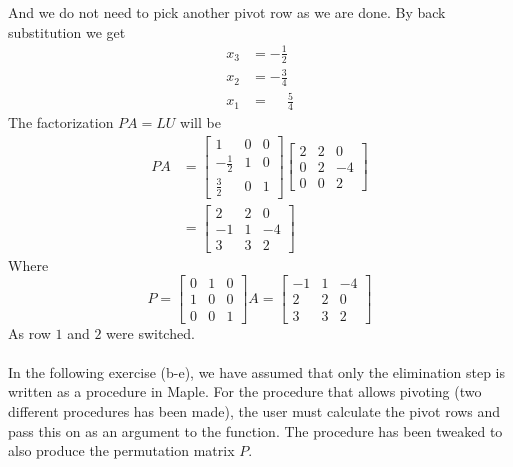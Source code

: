 \documentclass[12pt]{article}
\begin{document}
And we do not need to pick another pivot row as we are done. By back substitution we get
\begin{align*}
x_3&=-\frac{1}{2}\\
x_2&=-\frac{3}{4}\\
x_1&=\phantom{-}\frac{5}{4}
\end{align*}
The factorization $PA=LU$ will be
\begin{align*}
PA
&=
\begin{bmatrix}
1 & 0 & 0\\
-\frac{1}{2} & 1 & 0\\
\frac{3}{2} & 0 & 1
\end{bmatrix}
\begin{bmatrix}
2 & 2 & 0  \\
0 & 2 & -4\\
0 & 0 & 2
\end{bmatrix}\\
&=
\begin{bmatrix}
2 & 2 & 0  \\
-1 & 1 & -4\\
3 & 3 & 2
\end{bmatrix}
\end{align*}
Where
$$
P
=
\begin{bmatrix}
0 & 1 & 0  \\
1 & 0 & 0\\
0 & 0 & 1
\end{bmatrix}
A
=
\begin{bmatrix}
-1 & 1 & -4\\
2 & 2 & 0 \\
3 & 3 & 2 
\end{bmatrix}
$$
As row $1$ and $2$ were switched.\\
\\
In the following exercise (b-e), we have assumed that only the elimination step is written as a procedure in Maple. For the procedure that allows pivoting (two different procedures has been made), the user must calculate the pivot rows and pass this on as an argument to the function. The procedure has been tweaked to also produce the permutation matrix $P$.\\
\end{document}
